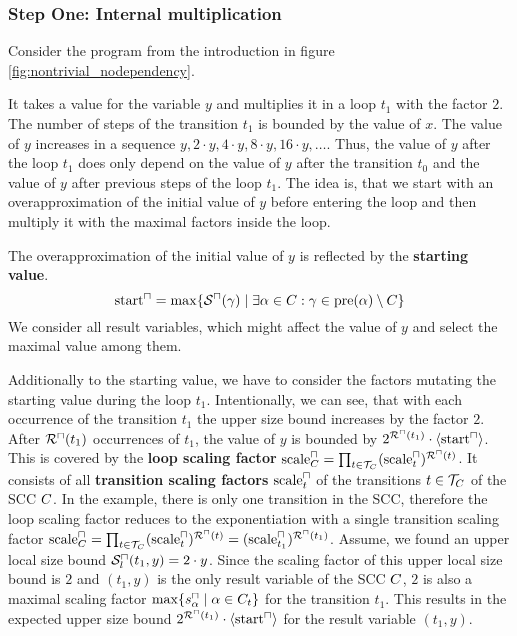 \subsubsection{Step One: Internal multiplication}

Consider the program from the introduction in figure \ref{fig:nontrivial_nodependency}.



It takes a value for the variable $y$ and multiplies it in a loop $t_1$ with the factor $2$.
The number of steps of the transition $t_1$ is bounded by the value of $x$.
The value of $y$ increases in a sequence $y, 2 \cdot y, 4 \cdot y, 8 \cdot y, 16 \cdot y, \dots$.
Thus, the value of $y$ after the loop $t_1$ does only depend on the value of $y$ after the transition $t_0$ and the value of $y$ after previous steps of the loop $t_1$.
The idea is, that we start with an overapproximation of the initial value of $y$ before entering the loop and then multiply it with the maximal factors inside the loop.

The overapproximation of the initial value of $y$ is reflected by the \textbf{starting value}.
\[ \text{start}^\sqcap = \max \lbrace {\mathcal{S}^\sqcap}(\gamma) \mid \exists \alpha \in C: \gamma \in \text{pre}(\alpha) \setminus C \rbrace \]
We consider all result variables, which might affect the value of $y$ and select the maximal value among them.

Additionally to the starting value, we have to consider the factors mutating the starting value during the loop $t_1$.
Intentionally, we can see, that with each occurrence of the transition $t_1$ the upper size bound increases by the factor $2$.
After ${\mathcal{R}^\sqcap}(t_1)$ occurrences of $t_1$, the value of $y$ is bounded by $2^{{\mathcal{R}^\sqcap}(t_1)} \cdot \langle\text{start}^\sqcap\rangle$.
This is covered by the \textbf{loop scaling factor} $\text{scale}^\sqcap_C = \prod_{t \in \mathcal{T}_C} (\text{scale}^\sqcap_t)^{{\mathcal{R}^\sqcap}(t)}$.
It consists of all \textbf{transition scaling factors} $\text{scale}^\sqcap_t$ of the transitions $t \in \mathcal{T}_C$ of the SCC $C$.
In the example, there is only one transition in the SCC, therefore the loop scaling factor reduces to the exponentiation with a single transition scaling factor $\text{scale}^\sqcap_C = \prod_{t \in \mathcal{T}_C} (\text{scale}^\sqcap_t)^{{\mathcal{R}^\sqcap}(t)} = (\text{scale}^\sqcap_{t_1})^{{\mathcal{R}^\sqcap}(t_1)}$.
Assume, we found an upper local size bound ${\mathcal{S}^\sqcap_l}(t_1,y) = 2 \cdot y$.
Since the scaling factor of this upper local size bound is $2$ and $(t_1,y)$ is the only result variable of the SCC $C$, $2$ is also a maximal scaling factor $\max \lbrace s^\sqcap_\alpha \mid \alpha \in C_t \rbrace$ for the transition $t_1$.
This results in the expected upper size bound $2^{{\mathcal{R}^\sqcap}(t_1)} \cdot \langle\text{start}^\sqcap\rangle$ for the result variable $(t_1,y)$.

